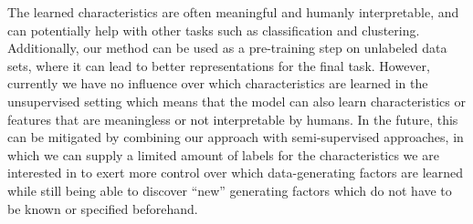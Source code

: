 \documentclass{esannV2}
\begin{document}
The learned characteristics are often meaningful and humanly interpretable, and can potentially help with other tasks such as classification and clustering. Additionally, our method can be used as a pre-training step on unlabeled data sets, where it can lead to better representations for the final task. However, currently we have no influence over which characteristics are learned in the unsupervised setting which means that the model can also learn characteristics or features that are meaningless or not interpretable by humans. In the future, this can be mitigated by combining our approach with semi-supervised approaches, in which we can supply a limited amount of labels for the characteristics we are interested in to exert more control over which data-generating factors are learned while still being able to discover ``new'' generating factors which do not have to be known or specified beforehand.

\begin{footnotesize}


\end{footnotesize}
\end{document}

